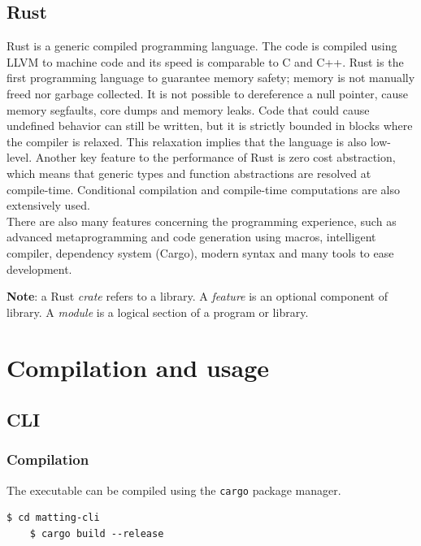 \documentclass[a4paper]{article}
\begin{document}
\wrapfill

\pagebreak

\subsection{Rust}

Rust\cite{rust} is a generic compiled programming language.
The code is compiled using LLVM to machine code and its speed
is comparable to C and C++.
Rust is the first programming language to guarantee memory safety;
memory is not manually freed nor garbage collected.
It is not possible to dereference a null pointer, cause memory segfaults, core dumps
and memory leaks.
Code that could cause undefined behavior can still be written,
but it is strictly bounded in blocks where the compiler is relaxed.
This relaxation implies that the language is also low-level.
Another key feature to the performance of Rust is zero cost abstraction,
which means that generic types and function abstractions are resolved at compile-time.
Conditional compilation and compile-time computations are also extensively used.
\\
There are also many features concerning the programming experience, such as
advanced metaprogramming and code generation using macros, intelligent compiler,
dependency system (Cargo), modern syntax and many tools to ease development.

\textbf{\color{red} Note}: a Rust \textit{crate} refers to a library.
A \textit{feature} is an optional component of library.
A \textit{module} is a logical section of a program or library.

\pagebreak

\section{Compilation and usage}

\subsection{CLI}

\subsubsection{Compilation}

The executable can be compiled using the \texttt{cargo}
package manager.

\begin{lstlisting}[style=boxed]
    $ cd matting-cli
    $ cargo build --release
\end{lstlisting}
\end{document}
